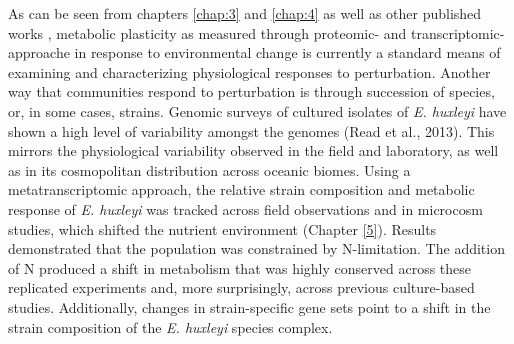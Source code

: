 As can be seen from chapters \ref{chap:3} and \ref{chap:4} as well as other published works \citep{Dyhrman2006, Dyhrman2012, Wurch2011, Bertrand2012a, Jones2013, Bender2014, Frischkorn2014}, metabolic plasticity as measured through proteomic- and transcriptomic-approache in response to environmental change is currently a standard means of examining and characterizing physiological responses to perturbation. Another way that communities respond to perturbation is through succession of species, or, in some cases, strains. Genomic surveys of cultured isolates of \textit{E. huxleyi} have shown a high level of variability amongst the genomes (Read et al., 2013). This mirrors the physiological variability observed in the field and laboratory, as well as in its cosmopolitan distribution across oceanic biomes. Using a metatranscriptomic approach, the relative strain composition and metabolic response of \textit{E. huxleyi} was tracked across field observations and in microcosm studies, which shifted the nutrient environment (Chapter \ref{5}). Results demonstrated that the population was constrained by N-limitation. The addition of N produced a shift in metabolism that was highly conserved across these replicated experiments and, more surprisingly, across previous culture-based studies. Additionally, changes in strain-specific gene sets point to a shift in the strain composition of the \textit{E. huxleyi} species complex. 
